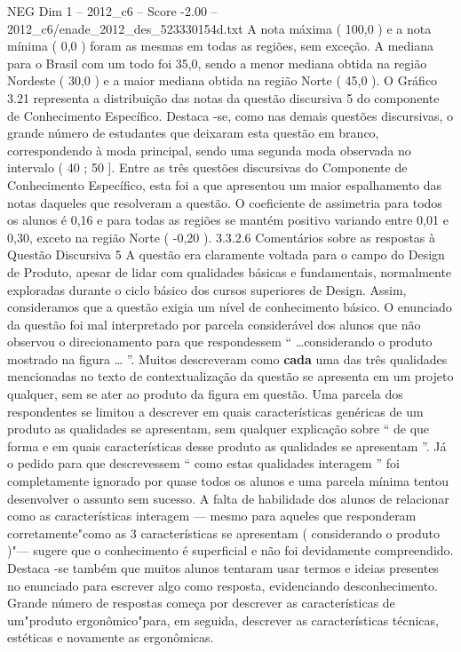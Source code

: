 \begin{textsample}{NEG Dim 1 – 2012\_c6 – Score -2.00 – 2012\_c6/enade\_2012\_des\_523330154d.txt}
A nota máxima ( 100,0 ) e a nota mínima ( 0,0 ) foram as mesmas em todas as regiões, sem exceção.
A mediana para o Brasil com um todo foi 35,0, sendo a menor mediana obtida na região Nordeste ( 30,0 ) e a maior mediana obtida na região Norte ( 45,0 ).
O Gráfico 3.21 representa a distribuição das notas da questão discursiva 5 do componente de Conhecimento Específico.
Destaca -se, como nas demais questões discursivas, o grande número de estudantes que deixaram esta questão em branco, correspondendo à moda principal, sendo uma segunda moda observada no intervalo ( 40 ; 50 ].
Entre as três questões discursivas do Componente de Conhecimento Específico, esta foi a que apresentou um maior espalhamento das notas daqueles que resolveram a questão.
O coeficiente de assimetria para todos os alunos é 0,16 e para todas as regiões se mantém positivo variando entre 0,01 e 0,30, exceto na região Norte ( -0,20 ). 3.3.2.6 Comentários sobre as respostas à Questão Discursiva 5 A questão era claramente voltada para o campo do Design de Produto, apesar de lidar com qualidades básicas e fundamentais, normalmente exploradas durante o ciclo básico dos cursos superiores de Design.
Assim, consideramos que a questão exigia um nível de conhecimento básico.
O enunciado da questão foi mal interpretado por parcela considerável dos alunos que não observou o direcionamento para que respondessem “ …considerando o produto mostrado na figura … ”.
Muitos descreveram como \textbf{cada} uma das três qualidades mencionadas no texto de contextualização da questão se apresenta em um projeto qualquer, sem se ater ao produto da figura em questão.
Uma parcela dos respondentes se limitou a descrever em quais características genéricas de um produto as qualidades se apresentam, sem qualquer explicação sobre “ de que forma e em quais características desse produto as qualidades se apresentam ”.
Já o pedido para que descrevessem “ como estas qualidades interagem ” foi completamente ignorado por quase todos os alunos e uma parcela mínima tentou desenvolver o assunto sem sucesso.
A falta de habilidade dos alunos de relacionar como as características interagem — mesmo para aqueles que responderam corretamente"como as 3 características se apresentam ( considerando o produto )"— sugere que o conhecimento é superficial e não foi devidamente compreendido.
Destaca -se também que muitos alunos tentaram usar termos e ideias presentes no enunciado para escrever algo como resposta, evidenciando desconhecimento.
Grande número de respostas começa por descrever as características de um"produto ergonômico"para, em seguida, descrever as características técnicas, estéticas e novamente as ergonômicas.

\end{textsample}

